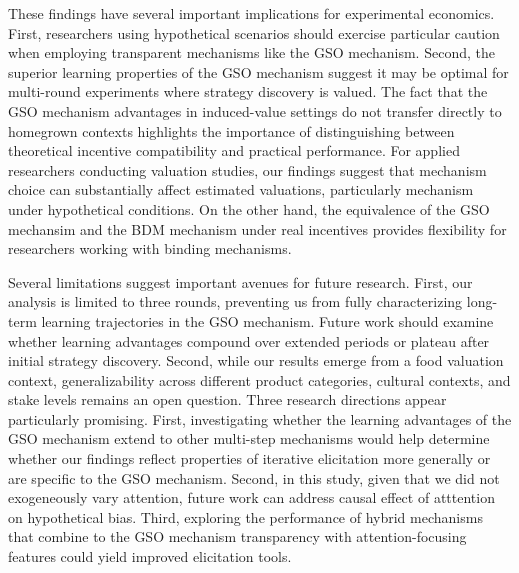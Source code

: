 \documentclass[12pt]{article}
\begin{document}
These findings have several important implications for experimental economics. First, researchers using hypothetical scenarios should exercise particular caution when employing transparent mechanisms like the GSO mechanism. Second, the superior learning properties of the GSO mechanism suggest it may be optimal for multi-round experiments where strategy discovery is valued. The fact that the GSO mechanism advantages in induced-value settings do not transfer directly to  homegrown contexts highlights the importance of distinguishing between theoretical incentive compatibility and practical performance. 
For applied researchers conducting valuation studies, our findings suggest that mechanism choice can substantially affect estimated valuations, particularly mechanism under hypothetical conditions. On the other hand, the equivalence of the GSO mechansim and the BDM mechanism under real incentives provides flexibility for researchers working with binding mechanisms.


Several limitations suggest important avenues for future research. First, our analysis is limited to three rounds, preventing us from fully characterizing long-term learning trajectories in the GSO mechanism. Future work should examine whether learning advantages compound over extended periods or plateau after initial strategy discovery. Second, while our results emerge from a food valuation context, generalizability across different product categories, cultural contexts, and stake levels remains an open question.
Three research directions appear particularly promising. First, investigating whether the learning advantages of the GSO mechanism extend to other multi-step mechanisms would help determine whether our findings reflect properties of iterative elicitation more generally or are specific to the GSO mechanism. Second, in this study, given that we did not exogeneously vary attention, future work can address causal effect of atttention on hypothetical bias. Third, exploring the performance of hybrid mechanisms that combine to the GSO mechanism transparency with attention-focusing features could yield improved elicitation tools.







\newpage
	\singlespacing
	\appendix
	\setcounter{table}{0}
	\setcounter{figure}{0}
	\renewcommand{\thetable}{A\arabic{table}}
	\renewcommand{\thefigure}{A\arabic{figure}}
	\setcounter{page}{1}
	\renewcommand{\thesubsection}{\Alph{subsection}}
\end{document}
